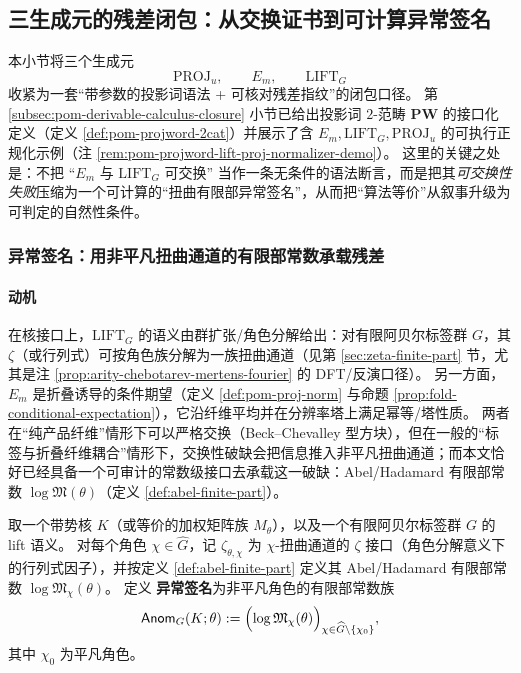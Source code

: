 \subsection{三生成元的残差闭包：从交换证书到可计算异常签名}\label{subsec:pom-three-generator-residual-closure}

本小节将三个生成元
$$
\mathrm{PROJ}_u,\qquad E_m,\qquad \mathrm{LIFT}_G
$$
收紧为一套“带参数的投影词语法 + 可核对残差指纹”的闭包口径。
第 \ref{subsec:pom-derivable-calculus-closure} 小节已给出投影词 $2$-范畴 $\mathbf{PW}$ 的接口化定义（定义 \ref{def:pom-projword-2cat}）并展示了含 \(E_m,\mathrm{LIFT}_G,\mathrm{PROJ}_u\) 的可执行正规化示例（注 \ref{rem:pom-projword-lift-proj-normalizer-demo}）。
这里的关键之处是：不把 “\(E_m\) 与 \(\mathrm{LIFT}_G\) 可交换” 当作一条无条件的语法断言，而是把其\emph{可交换性失败}压缩为一个可计算的“扭曲有限部异常签名”，从而把“算法等价”从叙事升级为可判定的自然性条件。

\subsubsection{异常签名：用非平凡扭曲通道的有限部常数承载残差}\label{subsec:pom-anom-signature}

\paragraph{动机}
在核接口上，\(\mathrm{LIFT}_G\) 的语义由群扩张/角色分解给出：对有限阿贝尔标签群 \(G\)，其 \(\zeta\)（或行列式）可按角色族分解为一族扭曲通道（见第 \ref{sec:zeta-finite-part} 节，尤其是注 \ref{prop:arity-chebotarev-mertens-fourier} 的 DFT/反演口径）。
另一方面，\(E_m\) 是折叠诱导的条件期望（定义 \ref{def:pom-proj-norm} 与命题 \ref{prop:fold-conditional-expectation}），它沿纤维平均并在分辨率塔上满足幂等/塔性质。
两者在“纯产品纤维”情形下可以严格交换（Beck--Chevalley 型方块），但在一般的“标签与折叠纤维耦合”情形下，交换性破缺会把信息推入非平凡扭曲通道；而本文恰好已经具备一个可审计的常数级接口去承载这一破缺：Abel/Hadamard 有限部常数 \(\log\mathfrak{M}(\theta)\)（定义 \ref{def:abel-finite-part}）。

\begin{definition}[扭曲有限部异常签名]\label{def:pom-anom-signature}
取一个带势核 \(K\)（或等价的加权矩阵族 \(M_\theta\)），以及一个有限阿贝尔标签群 \(G\) 的 lift 语义。
对每个角色 \(\chi\in\widehat G\)，记 \(\zeta_{\theta,\chi}\) 为 \(\chi\)-扭曲通道的 \(\zeta\) 接口（角色分解意义下的行列式因子），并按定义 \ref{def:abel-finite-part} 定义其 Abel/Hadamard 有限部常数 \(\log\mathfrak{M}_\chi(\theta)\)。
定义 \textbf{异常签名}为非平凡角色的有限部常数族
$$
\mathsf{Anom}_{G}(K;\theta)
:=\Bigl(\log\mathfrak{M}_\chi(\theta)\Bigr)_{\chi\in\widehat G\setminus\{\chi_0\}},
$$
其中 \(\chi_0\) 为平凡角色。
\end{definition}

